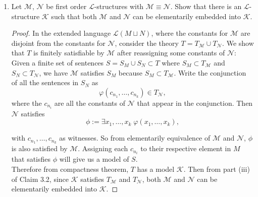 \documentclass{article}
\begin{document}
\begin{enumerate}
  \item Let $\mathcal{M}$, $\mathcal{N}$ be first order
    $\mathcal{L}$-structures with $\mathcal{M}\equiv\mathcal{N}$. Show that
    there is an $\mathcal{L}$-structure $\mathcal{K}$ such that both
    $\mathcal{M}$ and $\mathcal{N}$ can be elementarily embedded into
    $\mathcal{K}$. 

    \begin{proof}
      In the extended language $\mathcal{L}(M\sqcup N)$, where the constants
      for $\mathcal{M}$ are disjoint from the constants for $\mathcal{N}$,
      consider the theory $T=T_\mathcal{M}\cup T_\mathcal{N}$. We show that
      $T$ is finitely satisfiable by $\mathcal{M}$ after reassigning some
      constants of $\mathcal{N}$: Given a finite set of sentences
      $S=S_M\cup S_N\subset T$ where $S_M\subset T_\mathcal{M}$ and
      $S_N\subset T_\mathcal{N}$, we have $\mathcal{M}$ satisfies $S_M$
      because $S_M\subset T_\mathcal{M}$. Write the conjunction of all the
      sentences in $S_N$ as
      \begin{equation*}
        \varphi(c_{n_1},\ldots,c_{n_k})\in T_\mathcal{N},
      \end{equation*}
      where the $c_{n_i}$ are all the constants of $\mathcal{N}$ that appear in
      the conjunction. Then $\mathcal{N}$ satisfies
      \begin{equation*}
        \phi := \exists x_1,\ldots,x_k\; \varphi(x_1,\ldots,x_k),
      \end{equation*}

      with $c_{n_1},\ldots,c_{n_k}$ as witnesses. So from elementarily
      equivalence of $\mathcal{M}$ and $\mathcal{N}$, $\phi$ is also
      satisfied by $\mathcal{M}$. Assigning each $c_{n_i}$ to their respective
      element in $M$ that satisfies $\phi$ will give us a model of $S$. \\

      Therefore from compactness theorem, $T$ has a model $\mathcal{K}$. Then
      from part (iii) of Claim 3.2, since $\mathcal{K}$ satisfies
      $T_\mathcal{M}$ and $T_\mathcal{N}$, both $\mathcal{M}$ and
      $\mathcal{N}$ can be elementarily embedded into $\mathcal{K}$.
    \end{proof}
\end{enumerate}
\end{document}
